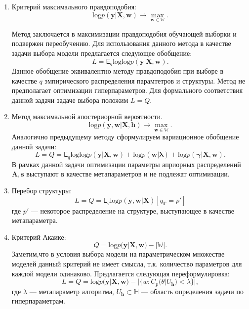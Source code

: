 \begin{enumerate}
\item Критерий максимального правдоподобия:
\[
    \text{log}p(\mathbf{y}|\mathbf{X}, \mathbf{w}) \to \max_{\mathbf{w} \in \mathbb{W}}.
\]

Метод заключается в максимизации правдоподобия обучающей выборки и подвержен переобучению.
Для использования данного метода в качестве задачи выбора модели предлагается следующее обобщение:
\begin{equation}
\label{eq:optim_ml}
    L =  \mathsf{E}_q \text{log} \text{log}p(\mathbf{y}|\mathbf{X}, \mathbf{w}).
\end{equation}
Данное обобщение эквивалентно  методу правдоподобия при выборе в качестве $q$ эмпирического распределения парамтетров и структуры.
Метод не предполагает оптимизации гиперпараметров. Для формального соответствия данной задачи задаче выбора положим $L=Q$.


\item Метод максимальной апостериорной вероятности. 
\[
    \text{log}p(\mathbf{y},\mathbf{w}|\mathbf{X}, \mathbf{h} ) \to \max_{\mathbf{w} \in \mathbb{W}}.
\]
Аналогично предыдущему методу сформулируем вариационное обобщение данной задачи:
\begin{equation}
\label{eq:optim_map}
    L = Q = \mathsf{E}_q \text{log} \text{log}p(\mathbf{y}|\mathbf{X}, \mathbf{w})+\text{log}p(\mathbf{w}|\boldsymbol{\lambda}) + \text{log}p(\boldsymbol{\gamma}|\mathbf{X}, \mathbf{w}).
\end{equation}
В рамках данной задачи оптимизации параметры априорных распределений $\mathbf{A}, \mathbf{s}$ выступают в качестве метапараметров и не подлежат оптимизации.



\item Перебор структуры:
\begin{equation}
\label{eq:optim_struct}
    L =  Q = \mathsf{E}_q\text{log}p(\mathbf{y}, \mathbf{w}|\mathbf{X})[q_{\boldsymbol{\Gamma}} = p']
\end{equation}
где $p'$ --- некоторое распределение на структуре, выступающее в качестве метапараметра.




\item Критерий Акаике:
\[
   Q =  \text{log}p(\mathbf{y}|\mathbf{X}, \mathbf{w}) - |\mathbb{W}|.
\]
Заметим,что в условия выбора модели на параметрическом множестве моделей данный критерий не имеет смысла, т.к. количество параметров для каждой модели одинаково. Предлагается следующая переформулировка:
\begin{equation}
\label{eq:optim_aic}
    L = Q = \text{log}p(\mathbf{y}|\mathbf{X}, \mathbf{w}) - |\{w: C_p(\theta|U_\mathbf{h})<\lambda\}|,
\end{equation}
где $\lambda$ --- метапараметр алгоритма, $U_\mathbf{h}  \subset \mathbb{H}$ --- область определения задачи по гиперпараметрам.


\end{enumerate}
